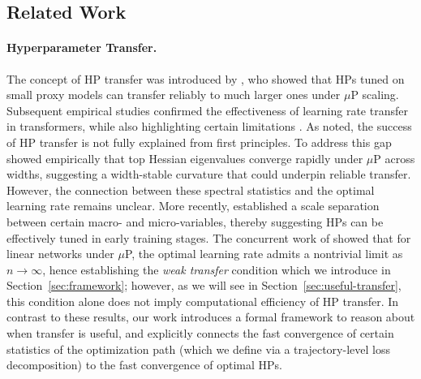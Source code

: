 \subsection{Related Work}\label{sec:related_work}

\paragraph{Hyperparameter Transfer.}
The concept of HP transfer was introduced by \citet{yang2022tensor}, who showed that HPs tuned on small proxy models can transfer reliably to much larger ones under $\mu$P scaling. Subsequent empirical studies confirmed the effectiveness of learning rate transfer in transformers, while also highlighting certain limitations \citep{lingle2024empirical, vlassis2025thorough}. As \citet{yang2022tensor} noted, the success of HP transfer is not fully explained from first principles. To address this gap \citet{noci2024super} showed empirically that top Hessian eigenvalues converge rapidly under $\mu$P across widths, suggesting a width-stable curvature that could underpin reliable transfer. However, the connection between these spectral statistics and the optimal learning rate remains unclear. More recently, \cite{hong2025provable} established a scale separation between certain macro- and micro-variables, thereby suggesting HPs can be effectively tuned in early training stages. The concurrent work of \cite{hayou2025proof} showed that for linear networks  under $\mu$P, the optimal learning rate admits a nontrivial limit as $n\to\infty$, hence establishing the \textit{weak transfer} condition which we introduce in Section~\ref{sec:framework}; however, as we will see in Section~\ref{sec:useful-transfer}, this condition alone does not imply computational efficiency of HP transfer. In contrast to these results, 
our work introduces a formal framework to reason about when transfer is useful, and explicitly connects the fast convergence of certain statistics of the optimization path (which we define via a trajectory-level loss decomposition) to the fast convergence of optimal HPs. 

